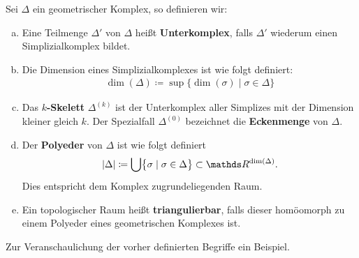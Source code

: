 \begin{Def}
  Sei $\Delta$ ein geometrischer Komplex, so definieren wir:
  \begin{enumerate}[(a)]
  \item Eine Teilmenge $\Delta'$ von $\Delta$ heißt
    \textbf{Unterkomplex}, falls $\Delta'$ wiederum einen
    Simplizialkomplex bildet.
  \item Die Dimension eines Simplizialkomplexes ist wie folgt
    definiert:
    \begin{gather*}
      \dim(\Delta) \coloneqq \sup \bigl\{ \dim(\sigma) \; | \;
        \sigma \in \Delta \bigr\}
    \end{gather*}
  \item Das \textbf{$k$-Skelett} $\Delta^{(k)}$ ist der Unterkomplex
    aller Simplizes mit der Dimension kleiner gleich $k$. Der
    Spezialfall $\Delta^{(0)}$ bezeichnet die \textbf{Eckenmenge} von
    $\Delta$.
  \item Der \textbf{Polyeder} von $\Delta$ ist wie folgt definiert
    \begin{gather*}
      |\Delta| \coloneqq \bigcup \bigl\{ \sigma \; | \; \sigma \in
        \Delta \bigr\} \subset \R^{\dim(\Delta)}.
    \end{gather*}
    Dies entspricht dem Komplex zugrundeliegenden Raum.
  \item Ein topologischer Raum heißt \textbf{triangulierbar}, falls
    dieser homöomorph zu einem Polyeder eines geometrischen Komplexes
    ist.
  \end{enumerate}
\end{Def}

Zur Veranschaulichung der vorher definierten Begriffe ein Beispiel.

